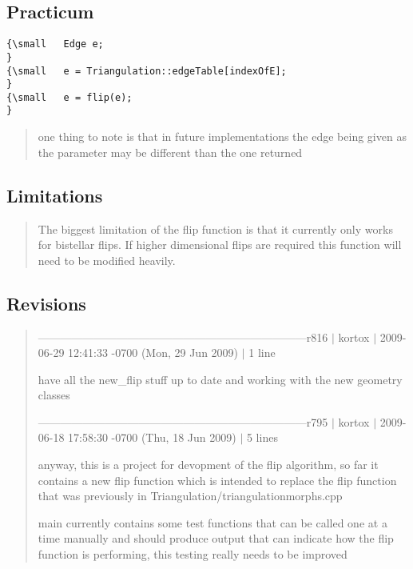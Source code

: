 \subsection*{Practicum}

{\small }
\begin{verbatim}
{\small   Edge e;
}
{\small   e = Triangulation::edgeTable[indexOfE];
}
{\small   e = flip(e);
}
\end{verbatim}

\begin{quotation}
one thing to note is that in future implementations the edge being given as
the parameter may be different than the one returned
\end{quotation}

\subsection*{Limitations}

\begin{quotation}
The biggest limitation of the flip function is that it currently only works
for bistellar flips. If higher dimensional flips are required this function
will need to be modified heavily.
\end{quotation}

\subsection*{Revisions}

\begin{quotation}
------------------------------------------------------------------------r816 %
\mbox{$|$} kortox \mbox{$|$} 2009-06-29 12:41:33 -0700 (Mon, 29 Jun 2009) %
\mbox{$|$} 1 line

have all the new\_flip stuff up to date and working with the new geometry
classes

------------------------------------------------------------------------r795 %
\mbox{$|$} kortox \mbox{$|$} 2009-06-18 17:58:30 -0700 (Thu, 18 Jun 2009) %
\mbox{$|$} 5 lines

anyway, this is a project for devopment of the flip algorithm, so far it
contains a new flip function which is intended to replace the flip function
that was previously in Triangulation/triangulationmorphs.cpp

main currently contains some test functions that can be called one at a time
manually and should produce output that can indicate how the flip function
is performing, this testing really needs to be improved
\end{quotation}

